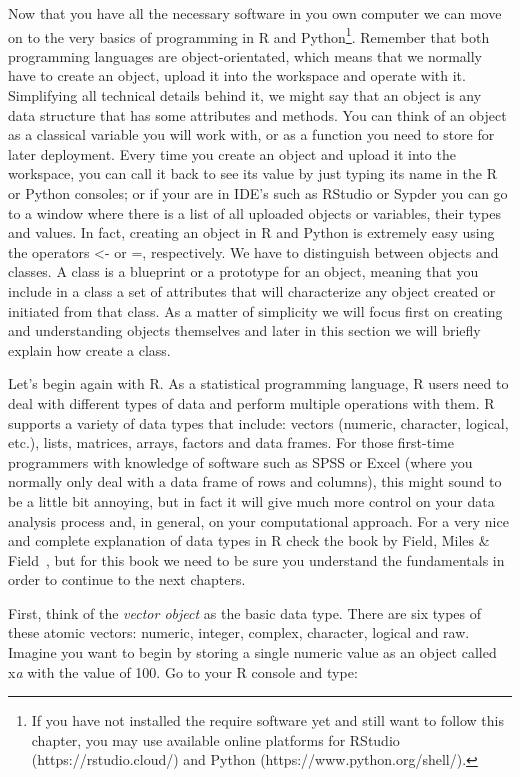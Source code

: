 Now that you have all the necessary software in you own computer we can move on to the very basics of programming in R and Python\footnote{If you have not installed the require software yet and still want to follow this chapter, you may use available online platforms for RStudio (https://rstudio.cloud/) and Python (https://www.python.org/shell/).}.  Remember that both programming languages are object-orientated, which means that we normally have to create an object, upload it into the workspace and operate with it. Simplifying all technical details behind it, we might say that an object is any data structure that has some attributes and methods. You can think of an object as a classical variable you will work with, or as a function you need to store for later deployment. Every time you create an object and upload it into the workspace, you can call it back to see its value by just typing its name in the R or Python consoles; or if your are in IDE's such as RStudio or Sypder you can go to a window where there is a list of all uploaded objects or variables, their types and values.  In fact, creating an object in R and Python is extremely easy using the operators \textless- or =, respectively. We have to distinguish between objects and classes. A class is a blueprint or a prototype for an object, meaning that you include in a class a set of attributes that will characterize any object created or initiated from that class. As a matter of simplicity we will focus first on creating and understanding objects themselves and later in this section we will briefly explain how create a class. 

Let's begin again with R.  As a statistical programming language, R users need to deal with different types of data and perform multiple operations with them. R supports a variety of data types that include: vectors (numeric, character, logical, etc.), lists, matrices, arrays, factors and data frames. For those first-time programmers with knowledge of software such as SPSS or Excel (where you normally only deal with a data frame of rows and columns), this might sound to be a little bit annoying, but in fact it will give much more control on your data analysis process and, in general, on your computational approach. For a very nice and complete explanation of data types in R check  the book by Field, Miles \& Field~\cite{field2012discovering}, but for this book we need to be sure you understand the fundamentals in order to continue to the next chapters. 

First, think of the \emph{vector object} as the basic data type.  There are six types of these atomic vectors: numeric, integer, complex, character, logical and raw. Imagine you want to begin by storing a single numeric value as an object called x\emph{a} with the value of 100. Go to your R console and type:

